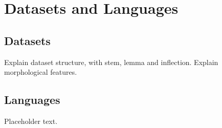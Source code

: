 \chapter{Datasets and Languages}\label{chapter:datasets}

\section{Datasets}

Explain dataset structure, with stem, lemma and inflection.
Explain morphological features.

\section{Languages}

Placeholder text.